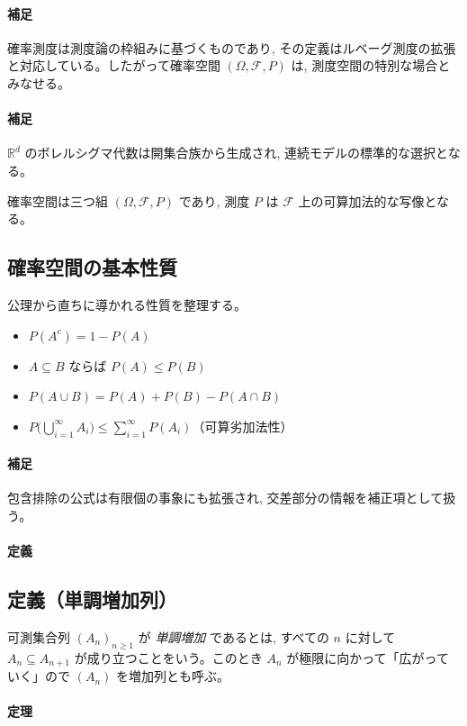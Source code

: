 \documentclass[uplatex,dvipdfmx,11pt,a4paper,openany]{bxjsbook}
\begin{document}
\paragraph{補足}
確率測度は測度論の枠組みに基づくものであり, その定義はルベーグ測度の拡張と対応している。したがって確率空間 $(\Omega, \mathcal{F}, P)$ は, 測度空間の特別な場合とみなせる。


\paragraph{補足}
$\mathbb{R}^d$ のボレルシグマ代数は開集合族から生成され, 連続モデルの標準的な選択となる。


確率空間は三つ組 $(\Omega, \mathcal{F}, P)$ であり, 測度 $P$ は $\mathcal{F}$ 上の可算加法的な写像となる。

\subsection{確率空間の基本性質}
公理から直ちに導かれる性質を整理する。

\begin{itemize}
\item $P(A^{c}) = 1 - P(A)$
\item $A \subseteq B$ ならば $P(A) \le P(B)$
\item $P(A \cup B) = P(A) + P(B) - P(A \cap B)$
\item $P\bigl(\bigcup_{i=1}^{\infty} A_i\bigr) \le \sum_{i=1}^{\infty} P(A_i)$（可算劣加法性）
\end{itemize}

\paragraph{補足}
包含排除の公式は有限個の事象にも拡張され, 交差部分の情報を補正項として扱う。


\paragraph{定義}
\subsection{定義（単調増加列）}
可測集合列 $(A_n)_{n\ge 1}$ が \emph{単調増加} であるとは, すべての $n$ に対して $A_n \subseteq A_{n+1}$ が成り立つことをいう。このとき $A_n$ が極限に向かって「広がっていく」ので $(A_n)$ を増加列とも呼ぶ。


\paragraph{定理}
\end{document}
